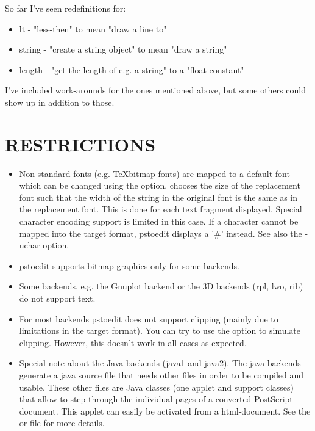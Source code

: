 \documentclass[english,a4paper]{article}
\begin{document}
So far I've seen redefinitions for:

\begin{itemize}

   \item lt - "less-then" to mean "draw a line to"
   \item string - "create a string object" to mean "draw a string"
   \item length - "get the length of e.g. a string" to a "float constant"
   
\end{itemize}

I've included work-arounds for the ones mentioned above, but some others
could show up in addition to those.


\section{RESTRICTIONS}

\begin{itemize}
\item Non-standard fonts (e.g. \TeX bitmap fonts) are mapped to a default font which
can be changed using the  option.  chooses the size of
the replacement font such that the width of the string in the original font is
the same as in the replacement font. This is done for each text fragment
displayed. Special character encoding support is limited in this case. If a
character cannot be mapped into the target format, pstoedit displays a '\#'
instead. See also the -uchar option.

\item pstoedit supports bitmap graphics only for some backends.

\item Some backends, e.g. the Gnuplot backend or the 3D backends (rpl, lwo, rib) do not support text.

\item For most backends pstoedit does not support clipping (mainly due to limitations in the target format). You can try to use the
 option to simulate clipping. However, this doesn't work in all cases
as expected.

\item Special note about the Java backends (java1 and java2).
The java backends generate a java source file that needs other files in
order to be compiled and usable. These other files are Java classes (one
applet and support classes) that allow to step through the individual pages
of a converted PostScript document. This applet can easily be activated from
a html-document. See the  or 
 file for more details.
 
\end{itemize}
\end{document}
